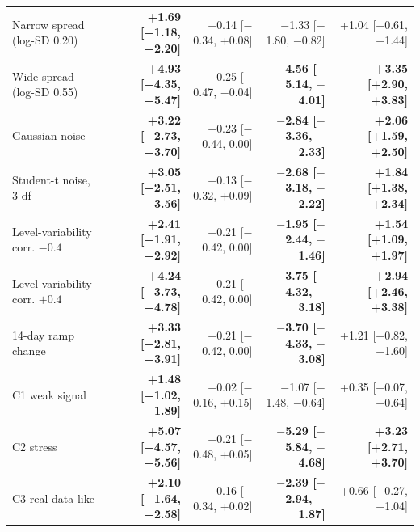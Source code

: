 \begin{table}[!htbp]
\begin{tabular}{@{}p{4.6cm}rrrr@{}}
Narrow spread (log-SD 0.20) & \textbf{+1.69 [+1.18, +2.20]} & $-$0.14 [$-$0.34, +0.08] & $-$1.33 [$-$1.80, $-$0.82] & +1.04 [+0.61, +1.44] \\
Wide spread (log-SD 0.55) & \textbf{+4.93 [+4.35, +5.47]} & $-$0.25 [$-$0.47, $-$0.04] & \textbf{$-$4.56 [$-$5.14, $-$4.01]} & \textbf{+3.35 [+2.90, +3.83]} \\
Gaussian noise & \textbf{+3.22 [+2.73, +3.70]} & $-$0.23 [$-$0.44, 0.00] & \textbf{$-$2.84 [$-$3.36, $-$2.33]} & \textbf{+2.06 [+1.59, +2.50]} \\
Student-t noise, 3 df & \textbf{+3.05 [+2.51, +3.56]} & $-$0.13 [$-$0.32, +0.09] & \textbf{$-$2.68 [$-$3.18, $-$2.22]} & \textbf{+1.84 [+1.38, +2.34]} \\
Level-variability corr. $-0.4$ & \textbf{+2.41 [+1.91, +2.92]} & $-$0.21 [$-$0.42, 0.00] & \textbf{$-$1.95 [$-$2.44, $-$1.46]} & \textbf{+1.54 [+1.09, +1.97]} \\
Level-variability corr. $+0.4$ & \textbf{+4.24 [+3.73, +4.78]} & $-$0.21 [$-$0.42, 0.00] & \textbf{$-$3.75 [$-$4.32, $-$3.18]} & \textbf{+2.94 [+2.46, +3.38]} \\
14-day ramp change & \textbf{+3.33 [+2.81, +3.91]} & $-$0.21 [$-$0.42, 0.00] & \textbf{$-$3.70 [$-$4.33, $-$3.08]} & +1.21 [+0.82, +1.60] \\
\midrule
C1 weak signal & \textbf{+1.48 [+1.02, +1.89]} & $-$0.02 [$-$0.16, +0.15] & $-$1.07 [$-$1.48, $-$0.64] & +0.35 [+0.07, +0.64] \\
C2 stress & \textbf{+5.07 [+4.57, +5.56]} & $-$0.21 [$-$0.48, +0.05] & \textbf{$-$5.29 [$-$5.84, $-$4.68]} & \textbf{+3.23 [+2.71, +3.70]} \\
C3 real-data-like & \textbf{+2.10 [+1.64, +2.58]} & $-$0.16 [$-$0.34, +0.02] & \textbf{$-$2.39 [$-$2.94, $-$1.87]} & +0.66 [+0.27, +1.04] \\
\bottomrule
\end{tabular}
\end{table}
